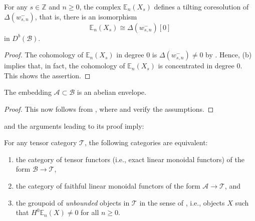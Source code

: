 \documentclass[11pt,oneside]{amsart}
\theoremstyle{definition}
\theoremstyle{remark}
\newcommand\EE{\mathbb E}
\newcommand\cA{\mathcal A}
\newcommand\cB{\mathcal B}
\newcommand\cT{\mathcal T}
\newcommand\ZZ{\mathbb Z}
\renewcommand\:\colon
\begin{document}
\begin{corollary} \label{cor:tilt-res} For any $s\in\ZZ$ and $n\ge0$, the complex $\EE_n(X_s)$ defines a tilting coresolution of $\Delta(w^-_{s,n})$, that is, there is an isomorphism
$$
    \EE_n(X_s) \cong \Delta(w^-_{s,n})[0]
$$
in $D^b(\cB)$.
\end{corollary}

\begin{proof}
    The cohomology of $\EE_n(X_s)$ in degree $0$ is $\Delta(w^-_{s,n})\neq0$ by . Hence, (b) implies that, in fact, the cohomology of $\EE_n(X_s)$ is concentrated in degree $0$. This shows the assertion.
\end{proof}

\begin{corollary} \label{cor:ab-env} The embedding $\cA\subset\cB$ is an abelian envelope.
\end{corollary}

\begin{proof} This now follows from , where  and  verify the assumptions.
\end{proof}

 and the arguments leading to its proof imply:

\begin{corollary} \label{rem:mapping-prop} For any tensor category $\cT$, the following categories are equivalent:
\begin{enumerate}
\renewcommand{\theenumi}{\alph{enumi}}
\item the category of tensor functors (i.e., exact linear monoidal functors) of the form $\cB\to\cT$,
\item the category of faithful linear monoidal functors of the form $\cA\to\cT$, and 
\item the groupoid of \emph{unbounded} objects in $\cT$ in the sense of \cite{CE}, i.e., objects $X$ such that $H^0\EE_n(X)\neq0$ for all $n\ge0$.
\end{enumerate}
\end{corollary}
\end{document}
